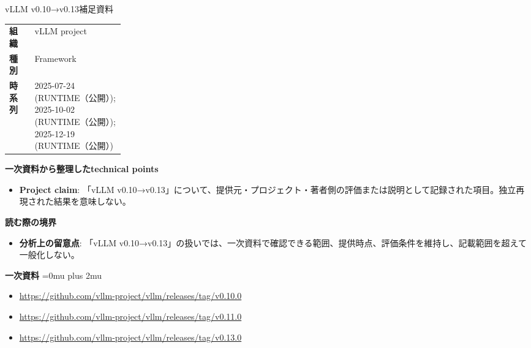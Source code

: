 \begin{technicalnote}{vLLM v0.10→v0.13}{補足資料}
\begingroup
\begin{tabularx}{\linewidth}{@{}>{\bfseries}p{0.22\linewidth}X@{}}
組織 & vLLM project \\
種別 & Framework \\
時系列 & 2025-07-24 (RUNTIME（公開）); 2025-10-02 (RUNTIME（公開）); 2025-12-19 (RUNTIME（公開）) \\
\end{tabularx}
\smallskip
{\bfseries 一次資料から整理したtechnical points}
\begin{itemize}[leftmargin=1.5em,itemsep=0.35em]
\item \textbf{Project claim}: 「vLLM v0.10→v0.13」について、提供元・プロジェクト・著者側の評価または説明として記録された項目。独立再現された結果を意味しない。
\end{itemize}
\begin{minipage}{\linewidth}
{\bfseries 読む際の境界}
\begin{itemize}[leftmargin=1.5em,itemsep=0.35em]
\item \textbf{分析上の留意点}: 「vLLM v0.10→v0.13」の扱いでは、一次資料で確認できる範囲、提供時点、評価条件を維持し、記載範囲を超えて一般化しない。
\end{itemize}
\begin{samepage}
{\bfseries 一次資料}
\begingroup\sloppy
\Urlmuskip=0mu plus 2mu\relax
\begin{itemize}[leftmargin=1.5em,itemsep=0.25em]
\item {\scriptsize\url{https://github.com/vllm-project/vllm/releases/tag/v0.10.0}}
\item {\scriptsize\url{https://github.com/vllm-project/vllm/releases/tag/v0.11.0}}
\item {\scriptsize\url{https://github.com/vllm-project/vllm/releases/tag/v0.13.0}}
\end{itemize}
\endgroup
\end{samepage}
\end{minipage}
\endgroup
\end{technicalnote}
\medskip

